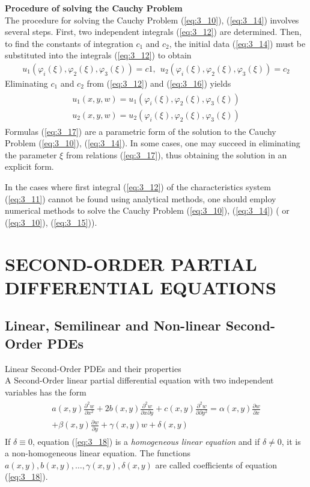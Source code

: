 \documentclass[11pt]{report}
\newcommand{\NI}{\noindent}
\newcommand{\sps}{\\[0.2cm]}
\newcommand{\refn}[1]{(\ref{#1})}
\newcommand{\refx}[1]{\refn{eq:#1}}
\newcommand{\bt}[1]{\textbf{#1}}
\begin{document}
	\NI\bt{Procedure of solving the Cauchy Problem}\sps
	The procedure for solving the Cauchy Problem \refx{3_10}, \refx{3_14} involves several steps. First, two independent integrals \refx{3_12} are determined. Then, to find the constants of integration $c_1$ and $c_2$, the initial data \refx{3_14} must be substituted into the integrals \refx{3_12} to obtain
	\begin{eqnarray}
		u_1(\varphi_i(\xi), \varphi_2(\xi), \varphi_3(\xi)) = c1,~~ u_2(\varphi_i(\xi), \varphi_2(\xi), \varphi_3(\xi))=c_2\label{eq:3_16}
	\end{eqnarray}
	Eliminating $c_1$ and $c_2$ from \refx{3_12} and \refx{3_16} yields
	\begin{eqnarray}
		\begin{split}
			u_1(x,y,w)=u_1(\varphi_i(\xi), \varphi_2(\xi), \varphi_3(\xi))\\
			u_2(x,y,w) = u_2(\varphi_i(\xi), \varphi_2(\xi), \varphi_3(\xi))
		\end{split}\label{eq:3_17}
	\end{eqnarray}
	Formulas \refx{3_17} are a parametric form of the solution to the Cauchy Problem \refx{3_10}, \refx{3_14}. In some cases, one may succeed in eliminating the parameter $\xi$ from relations \refx{3_17}, thus obtaining the solution in an explicit form.
	
	In the cases where first integral \refx{3_12} of the characteristics system \refx{3_11} cannot be found using analytical methods, one should employ numerical methods to solve the Cauchy Problem \refx{3_10}, \refx{3_14} ( or \refx{3_10}, \refx{3_15}).
	
	\section{SECOND-ORDER PARTIAL DIFFERENTIAL EQUATIONS}
	\subsection{Linear, Semilinear and Non-linear Second-Order PDEs}
	Linear Second-Order PDEs and their properties\sps
	A Second-Order linear partial differential equation with two independent variables has the form 
	\begin{eqnarray}
		\begin{split}
			a(x,y)\frac{\partial^2 w}{\partial x^2} + 2b(x,y)\frac{\partial^2 w}{\partial x \partial y} + c(x,y)\frac{\partial^2 w}{\partial \partial y^2} = \alpha(x,y)\frac{\partial w}{\partial x}\\ +\beta(x,y)\frac{\partial w}{\partial y}
			+ \gamma(x,y)w + \delta(x,y) 
		\end{split}\label{eq:3_18}
	\end{eqnarray}
	If $\delta\equiv 0$, equation \refx{3_18} is a \textit{homogeneous linear equation} and if $\delta \neq 0$, it is a non-homogeneous linear equation. The functions $a(x,y), b(x,y),\ldots,\gamma(x,y),\delta(x,y)$ are called coefficients of equation \refx{3_18}.\\
	
\end{document}
